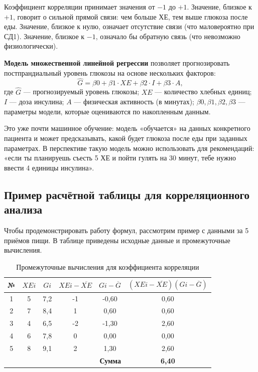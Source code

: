 \documentclass[14pt, a4paper]{extarticle}
\begin{document}
\medskip
\noindent Коэффициент корреляции принимает значения от $-1$ до $+1$. Значение, близкое к $+1$, говорит о сильной прямой связи: чем больше ХЕ, тем выше глюкоза после еды. Значение, близкое к нулю, означает отсутствие связи (что маловероятно при СД1). Значение, близкое к $-1$, означало бы обратную связь (что невозможно физиологически).

\medskip
\noindent \textbf{Модель множественной линейной регрессии} позволяет прогнозировать постпрандиальный уровень глюкозы на основе нескольких факторов:
\begin{equation}
\hat{G}=\beta0+\beta1 \cdot XE+\beta2 \cdot I+\beta3 \cdot A,
\end{equation}
где $\hat{G}$ — прогнозируемый уровень глюкозы; $XE$ — количество хлебных единиц; $I$ — доза инсулина; $A$ — физическая активность (в минутах); $\beta0,\beta1,\beta2,\beta3$ — параметры модели, которые оцениваются по накопленным данным.

\medskip
\noindent Это уже почти машинное обучение: модель «обучается» на данных конкретного пациента и может предсказывать, какой будет глюкоза после еды при заданных параметрах. В перспективе такую модель можно использовать для рекомендаций: «если ты планируешь съесть 5 ХЕ и пойти гулять на 30 минут, тебе нужно ввести 4 единицы инсулина».
\vskip 5cm
\subsection{Пример расчётной таблицы для корреляционного анализа}

\noindent Чтобы продемонстрировать работу формул, рассмотрим пример с данными за 5 приёмов пищи. В таблице приведены исходные данные и промежуточные вычисления.

\begin{longtable}{|c|c|c|c|c|c|}
\caption{Промежуточные вычисления для коэффициента корреляции}\\
\hline
\textbf{№} & $XEi$ & $Gi$ & $XEi-\overline{XE}$ & $Gi-\overline{G}$ & $(XEi-\overline{XE})(Gi-\overline{G})$ \\
\hline
1 & 5 & 7{,}2 & -1 & -0{,}60 & 0{,}60 \\
\hline
2 & 7 & 8{,}4 & 1 & 0{,}60 & 0{,}60 \\
\hline
3 & 4 & 6{,}5 & -2 & -1{,}30 & 2{,}60 \\
\hline
4 & 6 & 7{,}8 & 0 & 0{,}00 & 0{,}00 \\
\hline
5 & 8 & 9{,}1 & 2 & 1{,}30 & 2{,}60 \\
\hline
\multicolumn{5}{|r|}{\textbf{Сумма}} & \textbf{6{,}40} \\
\hline
\end{longtable}
\end{document}

